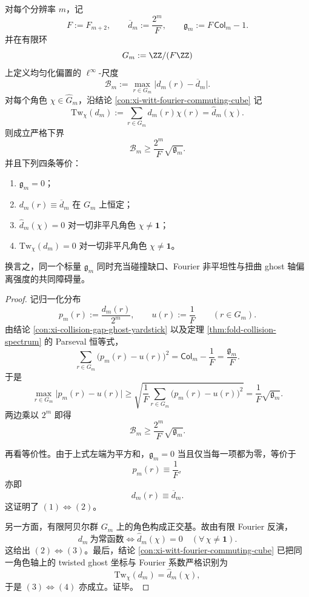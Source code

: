 \begin{theorem}\label{thm:conclusion-unified-ghost-yardstick-zero-test-supnorm-bias}
对每个分辨率 \(m\)，记
\[
F:=F_{m+2},
\qquad
\overline d_m:=\frac{2^m}{F},
\qquad
\mathfrak g_m:=F\,\mathsf{Col}_m-1.
\]
并在有限环
\[
G_m:=\ZZ/(F\ZZ)
\]
上定义均匀化偏置的 \(\ell^\infty\)-尺度
\[
\mathcal B_m:=\max_{r\in G_m}\bigl|d_m(r)-\overline d_m\bigr|.
\]
对每个角色 \(\chi\in \widehat G_m\)，沿结论 \ref{con:xi-witt-fourier-commuting-cube} 记
\[
\mathrm{Tw}_\chi(d_m):=\sum_{r\in G_m}d_m(r)\chi(r)=\widehat d_m(\chi).
\]
则成立严格下界
\[
\mathcal B_m\ge \frac{2^m}{F}\sqrt{\mathfrak g_m}.
\]
并且下列四条等价：
\begin{enumerate}
  \item \(\mathfrak g_m=0\)；
  \item \(d_m(r)\equiv \overline d_m\) 在 \(G_m\) 上恒定；
  \item \(\widehat d_m(\chi)=0\) 对一切非平凡角色 \(\chi\neq \mathbf 1\)；
  \item \(\mathrm{Tw}_\chi(d_m)=0\) 对一切非平凡角色 \(\chi\neq \mathbf 1\)。
\end{enumerate}
换言之，同一个标量 \(\mathfrak g_m\) 同时充当碰撞缺口、Fourier 非平坦性与扭曲 ghost 轴偏离强度的共同障碍量。
\end{theorem}
\begin{proof}
记归一化分布
\[
p_m(r):=\frac{d_m(r)}{2^m},
\qquad
u(r):=\frac1F
\qquad (r\in G_m).
\]
由结论 \ref{con:xi-collision-gap-ghost-yardstick} 以及定理 \ref{thm:fold-collision-spectrum} 的 Parseval 恒等式，
\[
\sum_{r\in G_m}\bigl(p_m(r)-u(r)\bigr)^2
=
\mathsf{Col}_m-\frac1F
=
\frac{\mathfrak g_m}{F}.
\]
于是
\[
\max_{r\in G_m}\bigl|p_m(r)-u(r)\bigr|
\ge
\sqrt{\frac1F\sum_{r\in G_m}\bigl(p_m(r)-u(r)\bigr)^2}
=
\frac1F\sqrt{\mathfrak g_m}.
\]
两边乘以 \(2^m\) 即得
\[
\mathcal B_m\ge \frac{2^m}{F}\sqrt{\mathfrak g_m}.
\]

再看等价性。由于上式左端为平方和，\(\mathfrak g_m=0\) 当且仅当每一项都为零，等价于
\[
p_m(r)\equiv \frac1F,
\]
亦即
\[
d_m(r)\equiv \overline d_m.
\]
这证明了 \((1)\Leftrightarrow(2)\)。

另一方面，有限阿贝尔群 \(G_m\) 上的角色构成正交基。故由有限 Fourier 反演，
\[
d_m\ \text{为常函数}
\iff
\widehat d_m(\chi)=0\quad(\forall\,\chi\neq\mathbf 1).
\]
这给出 \((2)\Leftrightarrow(3)\)。最后，结论 \ref{con:xi-witt-fourier-commuting-cube} 已把同一角色轴上的 twisted ghost 坐标与 Fourier 系数严格识别为
\[
\mathrm{Tw}_\chi(d_m)=\widehat d_m(\chi),
\]
于是 \((3)\Leftrightarrow(4)\) 亦成立。证毕。
\end{proof}

